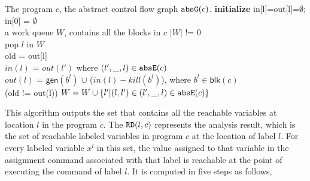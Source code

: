 \begin{enumerate}
\begin{algorithm}
 \caption{
 {Working List Algorithm ({$\kw{wklist(c, \absG(c)))}$})}
 \label{alg:adapt}
 }
 \begin{algorithmic}[1]
 \REQUIRE The program $c$, the abstract control flow graph $\mathtt{abs}{\mathtt{G}}(c)$.
 \STATE \textbf{initialize} in[l]=out[l]=$\emptyset$; in[0] = $\emptyset$
 \\
 a work queue $W$, contains all the blocks in $c$
  $|W|$ != 0 \\
 \STATE \quad pop $l$ in $W$ \\
 \STATE \quad old = out[l] \\
 \STATE \quad $in(l)$ = $out(l')$ where $(l',\_, l) \in \mathtt{abs}{\mathtt{E}}(c)$\\
 \STATE \quad $out(l)$ = $\mathsf{gen}(b^l)$ $\cup$ ($in(l) - kill(b^l)$), where $b^l \in \mathsf{blk}(c)$ \\
 \STATE {} (old != out(l)) $W = W \cup \{l'| (l,l') \in (l',\_, l) \in \mathtt{abs}{\mathtt{E}}(c)\}$ 
 \end{algorithmic}
 \end{algorithm}
\end{enumerate}
%
This algorithm outputs the set that contains all the reachable variables at location $l$ in the program $c$.
The $\mathtt{RD}(l, c)$ represents the analysis result, which is the set of 
reachable labeled variables in program $c$ at the location of label $l$.
For every labeled variable $x^l$ in this set, 
the value assigned to that variable
in the assignment command associated with that label is reachable at the point of executing the command of label $l$.
It is computed in five steps as follows,

%
